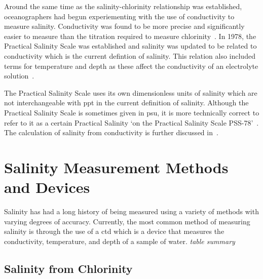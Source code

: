 Around the same time as the salinity-chlorinity relationship was established, oceanographers had begun experiementing with the use of conductivity to measure salinity.
Conductivity was found to be more precise and significantly easier to measure than the titration required to measure chlorinity~\cite{lewis_salinity_definition_and_calculation_1978}.
In 1978, the Practical Salinity Scale was established and salinity was updated to be related to conductivity which is the current defintion of salinity\cite{lewis_salinity_definition_and_calculation_1978}.
This relation also included terms for temperature and depth as these affect the conductivity of an electrolyte solution~\cite{zheng_electrical_conductivity_of_ocean_2017}.

The Practical Salinity Scale uses its own dimensionless units of salinity which are not interchangeable with \gls{ppt} in the current definition of salinity.
Although the Practical Salinity Scale is sometimes given in \gls{psu}, it is more technically correct to refer to it as a certain Practical Salinity `on the Practical Salinity Scale PSS-78'~\cite{lewis_salinity_definition_and_calculation_1978}.
The calculation of salinity from conductivity is further discussed in~.


\section{Salinity Measurement Methods and Devices}\label{sec:salinity-measurement-techniques}

Salinity has had a long history of being measured using a variety of methods with varying degrees of accuracy.
Currently, the most common method of measuring salinity is through the use of a \gls{ctd} which is a device that measures the conductivity, temperature, and depth of a sample of water.
\textit{table summary}

\subsection{Salinity from Chlorinity}\label{subsec:salinity-from-chlorinity}

